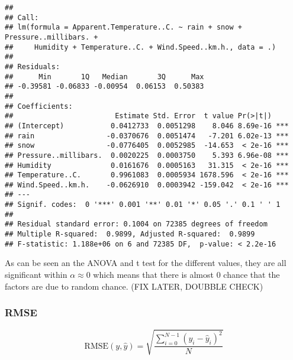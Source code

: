 \documentclass[
]{article}
\newenvironment{Shaded}{\begin{snugshade}}{\end{snugshade}}
\newcommand{\AttributeTok}[1]{\textcolor[rgb]{0.13,0.29,0.53}{#1}}
\newcommand{\FunctionTok}[1]{\textcolor[rgb]{0.13,0.29,0.53}{\textbf{#1}}}
\newcommand{\NormalTok}[1]{#1}
\newcommand{\OtherTok}[1]{\textcolor[rgb]{0.56,0.35,0.01}{#1}}
\newcommand{\SpecialCharTok}[1]{\textcolor[rgb]{0.81,0.36,0.00}{\textbf{#1}}}
\begin{document}
\begin{verbatim}
## 
## Call:
## lm(formula = Apparent.Temperature..C. ~ rain + snow + Pressure..millibars. + 
##     Humidity + Temperature..C. + Wind.Speed..km.h., data = .)
## 
## Residuals:
##      Min       1Q   Median       3Q      Max 
## -0.39581 -0.06833 -0.00954  0.06153  0.50383 
## 
## Coefficients:
##                        Estimate Std. Error  t value Pr(>|t|)    
## (Intercept)           0.0412733  0.0051298    8.046 8.69e-16 ***
## rain                 -0.0370676  0.0051474   -7.201 6.02e-13 ***
## snow                 -0.0776405  0.0052985  -14.653  < 2e-16 ***
## Pressure..millibars.  0.0020225  0.0003750    5.393 6.96e-08 ***
## Humidity              0.0161676  0.0005163   31.315  < 2e-16 ***
## Temperature..C.       0.9961083  0.0005934 1678.596  < 2e-16 ***
## Wind.Speed..km.h.    -0.0626910  0.0003942 -159.042  < 2e-16 ***
## ---
## Signif. codes:  0 '***' 0.001 '**' 0.01 '*' 0.05 '.' 0.1 ' ' 1
## 
## Residual standard error: 0.1004 on 72385 degrees of freedom
## Multiple R-squared:  0.9899, Adjusted R-squared:  0.9899 
## F-statistic: 1.188e+06 on 6 and 72385 DF,  p-value: < 2.2e-16
\end{verbatim}

As can be seen an the ANOVA and t test for the different values, they
are all significant within \(\alpha \approx 0\) which means that there
is almost 0 chance that the factors are due to random chance. (FIX
LATER, DOUBBLE CHECK)

\begin{Shaded}
\end{Shaded}

\subsubsection{RMSE}\label{rmse}

\[ \text{RMSE}(y, \hat{y}) = \sqrt{\frac{\sum_{i=0}^{N - 1} (y_i - \hat{y}_i)^2}{N}} \]
\end{document}
